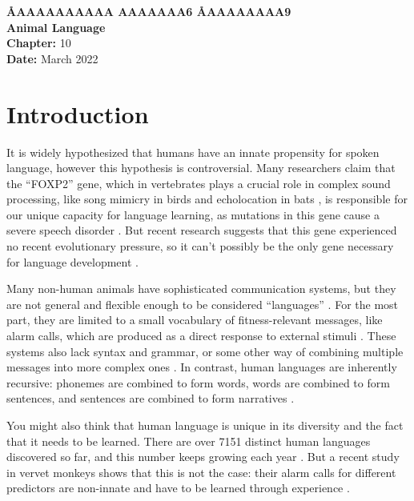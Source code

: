 \documentclass[a4paper,11pt]{article}
\begin{document}
  \begin{singlespace}
    \large
    {\bf \AA{AAAAAAAAAA AAAAAAA}{6} \AA{AAAAAAAA}{9}} \\[12pt]
    {\huge\bf Animal Language} \\[6pt]
    \textbf{Chapter:} 10 \\
    \textbf{Date:} March 2022
  \end{singlespace}
  \vspace{-\parskip}

  \section{Introduction}
  It is widely hypothesized that humans have an innate propensity for spoken language,
  however this hypothesis is controversial.
  Many researchers claim that the ``FOXP2'' gene,
  which in vertebrates plays a crucial role in complex sound processing,
  like song mimicry in birds and echolocation in bats \cite{campbell2009conservation},
  is responsible for our unique capacity for language learning,
  as mutations in this gene cause a severe speech disorder \cite{thebook2}.
  But recent research suggests that this gene experienced no recent evolutionary pressure,
  so it can't possibly be the only gene necessary for language development \cite{atkinson2018no}.

  Many non-human animals have sophisticated communication systems,
  but they are not general and flexible enough to be considered ``languages'' \cite{thebook2}.
  For the most part, they are limited to a small vocabulary of fitness-relevant messages,
  like alarm calls, which are produced as a direct response to external stimuli \cite{fitch2020animalcognition}.
  These systems also lack syntax and grammar,
  or some other way of combining multiple messages into more complex ones \cite{thebook2}.
  In contrast, human languages are inherently recursive:
  phonemes are combined to form words, words are combined to form sentences,
  and sentences are combined to form narratives \cite{bowling2015animal}.

  You might also think that human language is unique in its diversity and the fact that it needs to be learned.
  There are over 7151 distinct human languages discovered so far, and this number keeps growing each year \cite{ethnologue}.
  But a recent study in vervet monkeys shows that this is not the case:
  their alarm calls for different predictors are non-innate and have to be learned through experience \cite{liska1993bee}.
\end{document}
